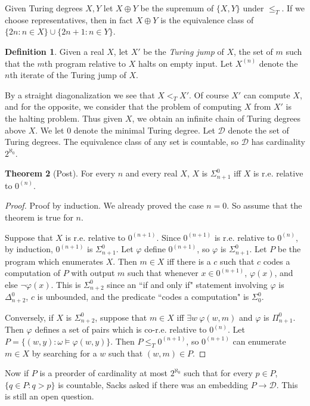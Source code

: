 \documentclass[12pt]{report}
\newcommand{\dfn}[1]{\emph{#1}\index{#1}}
\theoremstyle{definition}
\newtheorem{theorem}{Theorem}[chapter]
\newtheorem{definition}[theorem]{Definition}
\begin{document}
Given Turing degrees $X,Y$ let $X \oplus Y$ be the supremum of $\{X, Y\}$ under $\leq_T$. If we choose representatives, then in fact $X \oplus Y$ is the equivalence class of $\{2n: n \in X\} \cup \{2n + 1: n \in Y\}$.
\begin{definition}
Given a real $X$, let $X'$ be the \dfn{Turing jump} of $X$, the set of $m$ such that the $m$th program relative to $X$ halts on empty input. Let $X^{(n)}$ denote the $n$th iterate of the Turing jump of $X$.
\end{definition}
By a straight diagonalization we see that $X <_T X'$. Of course $X'$ can compute $X$, and for the opposite, we consider that the problem of computing $X$ from $X'$ is the halting problem.
Thus given $X$, we obtain an infinite chain of Turing degrees above $X$. We let $0$ denote the minimal Turing degree.
Let $\mathcal D$ denote the set of Turing degrees.
The equivalence class of any set is countable, so $\mathcal D$ has cardinality $2^{\aleph_0}$.

\begin{theorem}[Post]
For every $n$ and every real $X$, $X$ is $\Sigma_{n+1}^0$ iff $X$ is r.e. relative to $0^{(n)}$.
\end{theorem}
\begin{proof}
Proof by induction. We already proved the case $n = 0$. So assume that the theorem is true for $n$.

Suppose that $X$ is r.e. relative to $0^{(n+1)}$. Since $0^{(n+1)}$ is r.e. relative to $0^{(n)}$, by induction, $0^{(n+1)}$ is $\Sigma_{n+1}^0$.
Let $\varphi$ define $0^{(n+1)}$, so $\varphi$ is $\Sigma_{n+1}^0$. Let $P$ be the program which enumerates $X$. Then $m \in X$ iff there is a $c$ such that $c$ codes a computation of $P$ with output $m$ such that whenever $x \in 0^{(n+1)}$, $\varphi(x)$, and else $\neg \varphi(x)$.
This is $\Sigma_{n+2}^0$ since an ``if and only if" statement involving $\varphi$ is $\Delta_{n+2}^0$, $c$ is unbounded, and the predicate ``codes a computation" is $\Sigma_0^0$.

Conversely, if $X$ is $\Sigma_{n+2}^0$, suppose that $m \in X$ iff $\exists w ~\varphi(w, m)$ and $\varphi$ is $\Pi_{n+1}^0$. Then $\varphi$ defines a set of pairs which is co-r.e. relative to $0^{(n)}$.
Let $P = \{(w, y): \omega \models \varphi(w, y)\}$. Then $P \leq_T 0^{(n+1)}$, so $0^{(n+1)}$ can enumerate $m \in X$ by searching for a $w$ such that $(w, m) \in P$.
\end{proof}

Now if $P$ is a preorder of cardinality at most $2^{\aleph_0}$ such that for every $p \in P$, $\{q \in P: q > p\}$ is countable, Sacks asked if there was an embedding $P \to \mathcal D$. This is still an open question.
\end{document}
